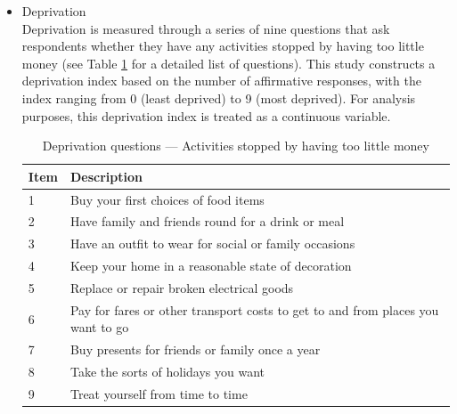 \begin{itemize}[wide=0pt, leftmargin=*, labelwidth=0pt, labelindent=\parindent, itemindent=0pt]
    \item Deprivation \\
    Deprivation is measured through a series of nine questions that ask respondents whether they have any activities stopped by having too little money (see Table \ref{tab:deprivation} for a detailed list of questions). This study constructs a deprivation index based on the number of affirmative responses, with the index ranging from 0 (least deprived) to 9 (most deprived). For analysis purposes, this deprivation index is treated as a continuous variable.

    \begin{table}[h!]
        \centering
        \caption{Deprivation questions --- Activities stopped by having too little money}
        \label{tab:deprivation}
        \begin{tabularx}{\textwidth}{lX}
            \toprule 
            Item & Description \\
            \midrule
            1 & Buy your first choices of food items \\
            2 & Have family and friends round for a drink or meal \\
            3 & Have an outfit to wear for social or family occasions \\
            4 & Keep your home in a reasonable state of decoration \\
            5 & Replace or repair broken electrical goods \\
            6 & Pay for fares or other transport costs to get to and from places you want to go \\
            7 & Buy presents for friends or family once a year \\
            8 & Take the sorts of holidays you want \\
            9 & Treat yourself from time to time \\
            \bottomrule
        \end{tabularx}
    \end{table}


\end{itemize}
